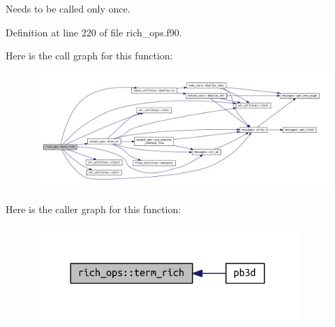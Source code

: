 Needs to be called only once. 

Definition at line 220 of file rich\+\_\+ops.\+f90.

Here is the call graph for this function\+:\nopagebreak
\begin{figure}[H]
\begin{center}
\leavevmode
\includegraphics[width=350pt]{namespacerich__ops_a3cf72a3ed0806ac9ddff262a00b2e33d_cgraph}
\end{center}
\end{figure}
Here is the caller graph for this function\+:\nopagebreak
\begin{figure}[H]
\begin{center}
\leavevmode
\includegraphics[width=288pt]{namespacerich__ops_a3cf72a3ed0806ac9ddff262a00b2e33d_icgraph}
\end{center}
\end{figure}
